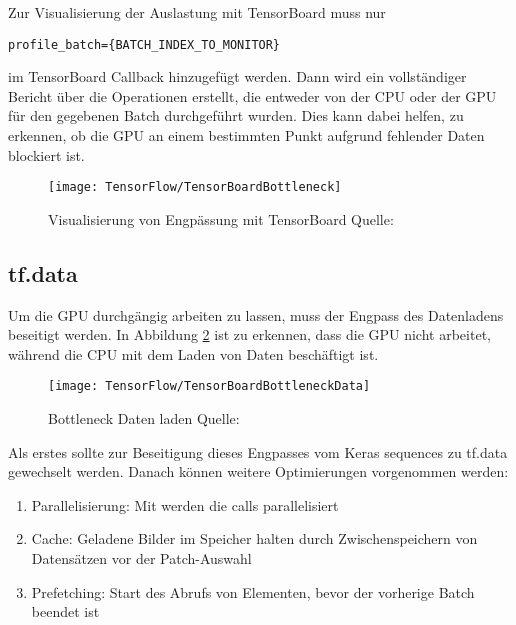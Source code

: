Zur Visualisierung der Auslastung mit TensorBoard muss nur

\begin{verbatim}
profile_batch={BATCH_INDEX_TO_MONITOR}
\end{verbatim}

im TensorBoard Callback hinzugefügt werden. Dann wird ein vollständiger Bericht über die Operationen erstellt, die 
entweder von der CPU oder der GPU für den gegebenen Batch durchgeführt wurden. 
Dies kann dabei helfen, zu erkennen, ob die GPU an einem bestimmten Punkt aufgrund fehlender Daten blockiert ist.

\begin{figure}[H]
	\begin{center}
		\texttt{[image: TensorFlow/TensorBoardBottleneck]}
		\caption{Visualisierung von Engpässung mit TensorBoard Quelle:\cite{KDnuggets.11.12.2020}} 
		\label{TensorBoardBottleneck}
	\end{center}
\end{figure}




\subsection{tf.data}
Um die GPU durchgängig arbeiten zu lassen, muss der Engpass des Datenladens beseitigt werden. 
In Abbildung \ref{TensorBoardBottleneckData} ist zu erkennen, dass die GPU nicht arbeitet, 
während die CPU mit dem Laden von Daten beschäftigt ist.

\begin{figure}[H]
	\begin{center}
		\texttt{[image: TensorFlow/TensorBoardBottleneckData]}
		\caption{Bottleneck Daten laden Quelle:\cite{KDnuggets.11.12.2020}} 
		\label{TensorBoardBottleneckData}
	\end{center}
\end{figure}

Als erstes sollte zur Beseitigung dieses Engpasses vom Keras sequences
zu tf.data gewechselt werden. Danach können weitere Optimierungen vorgenommen werden:


\begin{enumerate}
\item Parallelisierung: Mit  werden die  calls parallelisiert
\item Cache: Geladene Bilder im Speicher halten durch Zwischenspeichern von Datensätzen vor der Patch-Auswahl
\item Prefetching: Start des Abrufs von Elementen, bevor der vorherige Batch beendet ist
\end{enumerate}

